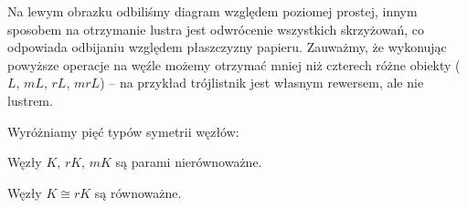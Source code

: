 Na lewym obrazku odbiliśmy diagram względem poziomej prostej, innym sposobem na otrzymanie lustra jest odwrócenie wszystkich skrzyżowań, co odpowiada odbijaniu względem płaszczyzny papieru.
Zauważmy, że wykonując powyższe operacje na węźle możemy otrzymać mniej niż czterech różne obiekty ($L$, $mL$, $rL$, $mrL$) -- na przykład trójlistnik jest własnym rewersem, ale nie lustrem.

Wyróżniamy pięć typów symetrii węzłów:

\begin{definition}
%
%
    Węzły $K$, $rK$, $mK$ są parami nierównoważne. %
\end{definition}

\begin{definition}[odwracalny]
    Węzły $K \cong rK$ są równoważne. %
\end{definition}

